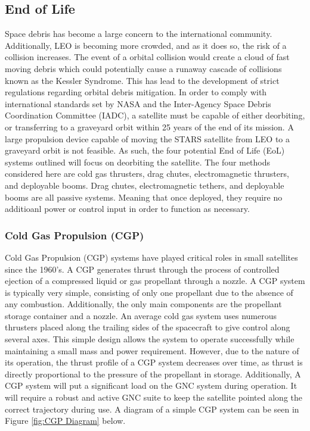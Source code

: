 
\subsection{End of Life}

Space debris has become a large concern to the international community. Additionally, LEO is becoming more crowded, and as it does so, the risk of a collision increases. The event of a orbital collision would create a cloud of fast moving debris which could potentially cause a runaway cascade of collisions known as the Kessler Syndrome\cite{Kessler_Syndrome}.  This has lead to the development of strict regulations regarding orbital debris mitigation. In order to comply with international standards set by NASA and the Inter-Agency Space Debris Coordination Committee (IADC), a satellite must be capable of either deorbiting, or transferring to a graveyard orbit within 25 years of the end of its mission\cite{STD8719}. A large propulsion device capable of moving the STARS satellite from LEO to a graveyard orbit is not feasible. As such, the four potential End of Life (EoL) systems outlined will focus on deorbiting the satellite. The four methods considered here are cold gas thrusters, drag chutes, electromagnetic thrusters, and deployable booms. Drag chutes, electromagnetic tethers, and deployable booms are all passive systems. Meaning that once deployed, they require no additioanl power or control input in order to function as necessary. 
\subsubsection{Cold Gas Propulsion (CGP)}

Cold Gas Propulsion (CGP) systems have played critical roles in small satellites since the 1960's. A CGP generates thrust through the process of controlled ejection of a compressed liquid or gas propellant through a nozzle. A CGP system is typically very simple, consisting of only one propellant due to the absence of any combustion. Additionally, the only main components are the propellant storage container and a nozzle. An average cold gas system uses numerous thrusters placed along the trailing sides of the spacecraft to give control along several axes. This simple design allows the system to operate successfully while maintaining a small mass and power requirement. However, due to the nature of its operation, the thrust profile of a CGP system decreases over time, as thrust is directly proportional to the pressure of the propellant in storage\cite{Passive_Deorbit}. Additionally, A CGP system will put a significant load on the GNC system during operation. It will require a robust and active GNC suite to keep the satellite pointed along the correct trajectory during use. A diagram of a simple CGP system can be seen in Figure \ref{fig:CGP Diagram} below.


